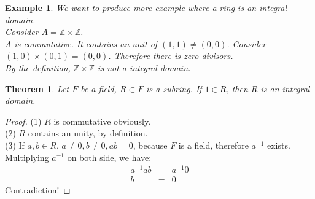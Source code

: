 \documentclass{article}
\theoremstyle{MyNonumberplain}
\theoremstyle{break}
\newtheorem*{proof}{Proof. }
\theoremstyle{break}
\newtheorem{theorem}{Theorem}[section]
\newtheorem{example}{Example}[section]
\theoremstyle{break}
\theoremstyle{definition}
\theoremstyle{break}
\begin{document}

\begin{expbox}
    \begin{example}
        We want to produce more example where a ring is an integral domain.\\

        Consider $A =\mathbb{Z} \times \mathbb{Z}$.\\
        
        $A$ is commutative. It contains an unit of $(1, 1) \neq (0, 0)$. Consider $(1,
        0) \times (0, 1) = (0, 0)$. Therefore there is zero divisors.\\
        
        By the definition, $\mathbb{Z} \times \mathbb{Z}$ is not a integral domain. 
    \end{example}
\end{expbox}

\begin{thmbox}
    \begin{theorem}
        Let $F$ be a field, $R \subset F$ is a subring. If $1 \in R$, then $R$ is an
        integral domain.
    \end{theorem}
    \begin{prfbox}
        \begin{proof}
            (1) $R$ is commutative obviously.\\

            (2) $R$ contains an unity, by definition.\\
            
            (3) If $a, b \in R$, $a \neq 0, b \neq 0, a b = 0$, because $F$ is a field,
            therefore $a^{- 1}$ exists. Multiplying $a^{- 1}$ on both side, we have:
            \begin{eqnarray*}
              a^{- 1} a b & = & a^{- 1} 0\\
              b & = & 0
            \end{eqnarray*}
            Contradiction!
        \end{proof}
    \end{prfbox}
\end{thmbox}

\setcounter{example}{0}
\end{document}

